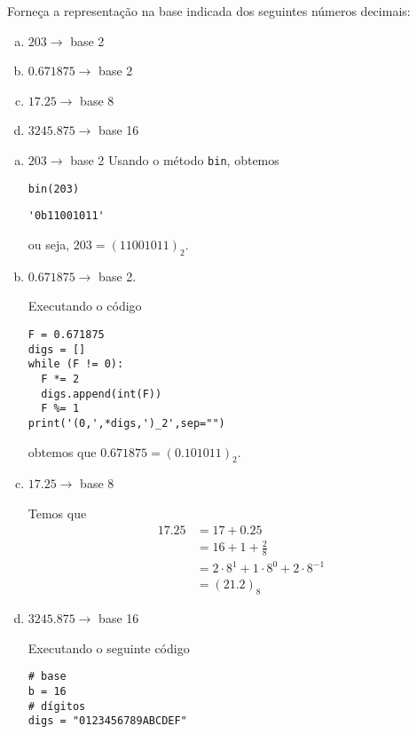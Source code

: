 \begin{exeresol}
  Forneça a representação na base indicada dos seguintes números decimais:
  \begin{enumerate}[a)]
  \item $203 \to$ base 2
  \item $0.671875 \to$ base 2
  \item $17.25 \to$ base 8
  \item $3245.875 \to$ base 16
  \end{enumerate}
\end{exeresol}
\begin{resol}
  \begin{enumerate}[a)]

  \item $203 \to$ base 2
    Usando o método {\python} \texttt{bin}, obtemos

\begin{lstlisting}
bin(203)
\end{lstlisting}

\begin{verbatim}
'0b11001011'
\end{verbatim}
    ou seja, $203 = (11001011)_2$.

  \item $0.671875 \to$ base 2.

    Executando o código

\begin{lstlisting}
F = 0.671875
digs = []
while (F != 0):
  F *= 2
  digs.append(int(F))
  F %= 1
print('(0,',*digs,')_2',sep="")      
\end{lstlisting}

\noindent obtemos que $0.671875 = (0.101011)_2$.

  \item $17.25 \to$ base 8

    Temos que
    \begin{align}
      17.25 &= 17 + 0.25\\
            &= 16 + 1 + \frac{2}{8}\\
            &= 2\cdot 8^1 + 1\cdot 8^0 + 2\cdot 8^{-1}\\
            &= (21.2)_8
    \end{align}

  \item $3245.875 \to$ base 16

    Executando o seguinte código

\begin{lstlisting}
# base
b = 16
# dígitos
digs = "0123456789ABCDEF"


\end{lstlisting}
\end{enumerate}
\end{resol}
